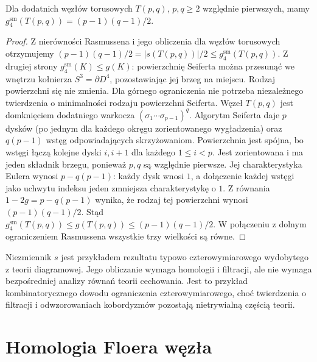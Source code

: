\begin{wniosek}
Dla dodatnich węzłów torusowych $T(p,q)$,
$p,q\geq2$ względnie pierwszych, mamy
$g_4^{\mathrm{sm}}(T(p,q))=(p-1)(q-1)/2$.
\end{wniosek}

\begin{proof}
Z nierówności Rasmussena i jego obliczenia dla węzłów
torusowych otrzymujemy
$(p-1)(q-1)/2=|s(T(p,q))|/2\leq g_4^{\mathrm{sm}}(T(p,q))$.
Z drugiej strony $g_4^{\mathrm{sm}}(K)\leq g(K)$:
powierzchnię Seiferta można przesunąć we wnętrzu
kołnierza $S^3=\partial D^4$, pozostawiając jej
brzeg na miejscu. Rodzaj powierzchni się nie zmienia.
Dla górnego ograniczenia nie potrzeba niezależnego
twierdzenia o minimalności rodzaju powierzchni Seiferta.
Węzeł $T(p,q)$ jest domknięciem dodatniego warkocza
$(\sigma_1\cdots\sigma_{p-1})^q$. Algorytm Seiferta
daje $p$ dysków (po jednym dla każdego okręgu
zorientowanego wygładzenia) oraz $q(p-1)$ wstęg
odpowiadających skrzyżowaniom. Powierzchnia jest
spójna, bo wstęgi łączą kolejne dyski $i,i+1$
dla każdego $1\leq i<p$. Jest zorientowana
i ma jeden składnik brzegu, ponieważ $p,q$ są
względnie pierwsze. Jej charakterystyka Eulera
wynosi $p-q(p-1)$: każdy dysk wnosi $1$,
a dołączenie każdej wstęgi jako uchwytu
indeksu jeden zmniejsza charakterystykę o $1$.
Z równania $1-2g=p-q(p-1)$ wynika, że rodzaj
tej powierzchni wynosi $(p-1)(q-1)/2$.
Stąd $g_4^{\mathrm{sm}}(T(p,q))\leq
g(T(p,q))\leq(p-1)(q-1)/2$.
W połączeniu z dolnym ograniczeniem Rasmussena
wszystkie trzy wielkości są równe.
\end{proof}

\begin{uwaga}
Niezmiennik $s$ jest przykładem rezultatu typowo
czterowymiarowego wydobytego z teorii diagramowej.
Jego obliczanie wymaga homologii i filtracji, ale nie
wymaga bezpośredniej analizy równań teorii cechowania.
Jest to przykład kombinatorycznego dowodu
ograniczenia czterowymiarowego, choć twierdzenia
o filtracji i odwzorowaniach kobordyzmów pozostają
nietrywialną częścią teorii.
\end{uwaga}

\section{Homologia Floera węzła}
\label{sec:kt-hfk}

